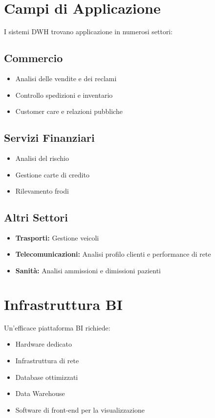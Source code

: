 \section{Campi di Applicazione}

I sistemi DWH trovano applicazione in numerosi settori:

\subsection{Commercio}
\begin{itemize}
\item Analisi delle vendite e dei reclami
\item Controllo spedizioni e inventario
\item Customer care e relazioni pubbliche
\end{itemize}

\subsection{Servizi Finanziari}
\begin{itemize}
\item Analisi del rischio
\item Gestione carte di credito
\item Rilevamento frodi
\end{itemize}

\subsection{Altri Settori}
\begin{itemize}
\item \textbf{Trasporti:} Gestione veicoli
\item \textbf{Telecomunicazioni:} Analisi profilo clienti e performance di rete
\item \textbf{Sanità:} Analisi ammissioni e dimissioni pazienti
\end{itemize}

\section{Infrastruttura BI}

Un'efficace piattaforma BI richiede:

\begin{itemize}
\item Hardware dedicato
\item Infrastruttura di rete
\item Database ottimizzati
\item Data Warehouse
\item Software di front-end per la visualizzazione
\end{itemize}